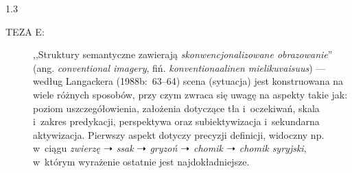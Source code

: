\documentclass[11pt,a4paper,twoside]{report}
\begin{document}
\begin{spacing}{1.3}
\begin{description}
  \item[TEZA E:] ,,Struktury semantyczne zawierają \emph{skonwencjonalizowane obrazowanie}'' \linebreak (ang. \emph{conventional imagery}, fiń. \textit{konventionaalinen mielikuvaisuus}) --- według Langackera (1988b:~63--64) scena (sytuacja) jest konstruowana na wiele różnych sposobów, przy czym zwraca się uwagę na aspekty takie jak: poziom uszczegółowienia, założenia dotyczące tła i~oczekiwań, skala i~zakres predykacji, perspektywa oraz subiektywizacja i~sekundarna aktywizacja. Pierwszy aspekt dotyczy precyzji definicji, widoczny np. w~ciągu \emph{zwierzę} $\textrm{\ding{221}}$ \emph{ssak} $\textrm{\ding{221}}$ \emph{gryzoń} $\textrm{\ding{221}}$ \emph{chomik} $\textrm{\ding{221}}$ \emph{chomik syryjski}, w~którym wyrażenie ostatnie jest najdokładniejsze.
\end{description}
\newpage





\end{spacing}
\end{document}
